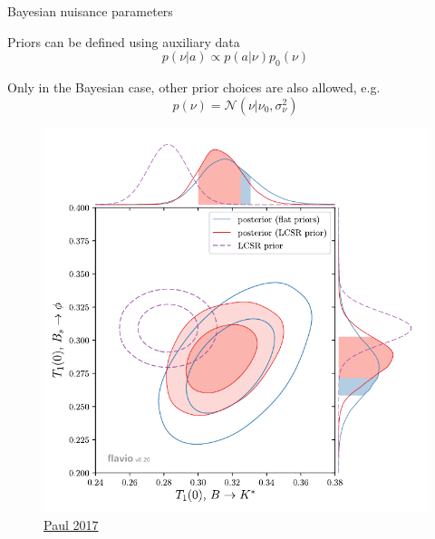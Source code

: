 \documentclass[
aspectratio=169,
14pt,
professionalfonts
]{beamer}
\begin{document}
\begin{frame}{Bayesian nuisance parameters}
    \begin{minipage}{0.6\textwidth}
        Priors can be defined using auxiliary data
        $$p(\nu|a) \propto p(a|\nu) p_0(\nu)$$
        
        Only in the Bayesian case, other prior choices are also allowed, e.g.
        $$ p(\nu) = \mathcal{N}(\nu | \nu_0, \sigma_\nu^2)$$
        
    \end{minipage}
    \begin{minipage}{0.39\textwidth}
        \begin{figure}
            \centering
            \includegraphics[width=\textwidth]{../plots/straub-posterior.pdf}
            \flushright \small
        \href{https://arxiv.org/pdf/2311.14647}{Paul 2017}
        \end{figure}
    \end{minipage}
\end{frame}
    
\end{document}
